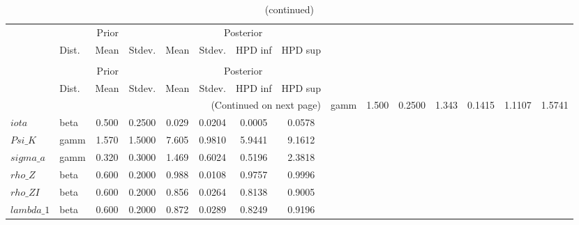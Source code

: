  
\begin{center}
\begin{longtable}{llcccccc} 
\caption{Results from Metropolis-Hastings (parameters)}
 \label{Table:MHPosterior:1}\\
\toprule 
  & \multicolumn{3}{c}{Prior}  &  \multicolumn{4}{c}{Posterior} \\
  \cmidrule(r{.75em}){2-4} \cmidrule(r{.75em}){5-8}
  & Dist. & Mean  & Stdev. & Mean & Stdev. & HPD inf & HPD sup\\
\midrule \endfirsthead 
\caption{(continued)}\\\toprule 
  & \multicolumn{3}{c}{Prior}  &  \multicolumn{4}{c}{Posterior} \\
  \cmidrule(r{.75em}){2-4} \cmidrule(r{.75em}){5-8}
  & Dist. & Mean  & Stdev. & Mean & Stdev. & HPD inf & HPD sup\\
\midrule \endhead 
\bottomrule \multicolumn{8}{r}{(Continued on next page)} \endfoot 
\bottomrule \endlastfoot 
$sigma$ & gamm &   1.500 & 0.2500 &   1.343& 0.1415 &  1.1107 &  1.5741 \\ 
$iota$ & beta &   0.500 & 0.2500 &   0.029& 0.0204 &  0.0005 &  0.0578 \\ 
$Psi\_K$ & gamm &   1.570 & 1.5000 &   7.605& 0.9810 &  5.9441 &  9.1612 \\ 
$sigma\_a$ & gamm &   0.320 & 0.3000 &   1.469& 0.6024 &  0.5196 &  2.3818 \\ 
$rho\_Z$ & beta &   0.600 & 0.2000 &   0.988& 0.0108 &  0.9757 &  0.9996 \\ 
$rho\_ZI$ & beta &   0.600 & 0.2000 &   0.856& 0.0264 &  0.8138 &  0.9005 \\ 
$lambda\_1$ & beta &   0.600 & 0.2000 &   0.872& 0.0289 &  0.8249 &  0.9196 \\ 
\end{longtable}
 \end{center}
